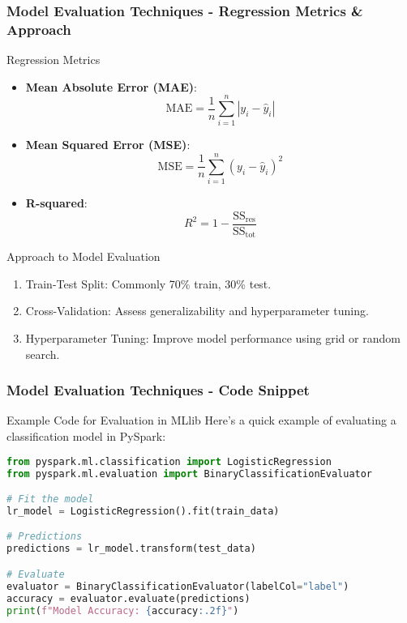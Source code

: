 \documentclass[aspectratio=169]{beamer}
\begin{document}
\begin{frame}[fragile]
    \frametitle{Model Evaluation Techniques - Regression Metrics & Approach}
    \begin{block}{Regression Metrics}
        \begin{itemize}
            \item \textbf{Mean Absolute Error (MAE)}:
            \[
            \text{MAE} = \frac{1}{n} \sum_{i=1}^{n} |y_i - \hat{y}_i|
            \]
            \item \textbf{Mean Squared Error (MSE)}:
            \[
            \text{MSE} = \frac{1}{n} \sum_{i=1}^{n} (y_i - \hat{y}_i)^2
            \]
            \item \textbf{R-squared}:
            \[
            R^2 = 1 - \frac{\text{SS}_{\text{res}}}{\text{SS}_{\text{tot}}}
            \]
        \end{itemize}
    \end{block}
    
    \begin{block}{Approach to Model Evaluation}
        \begin{enumerate}
            \item Train-Test Split: Commonly 70\% train, 30\% test.
            \item Cross-Validation: Assess generalizability and hyperparameter tuning.
            \item Hyperparameter Tuning: Improve model performance using grid or random search.
        \end{enumerate}
    \end{block}
\end{frame}

\begin{frame}[fragile]
    \frametitle{Model Evaluation Techniques - Code Snippet}
    \begin{block}{Example Code for Evaluation in MLlib}
        Here’s a quick example of evaluating a classification model in PySpark:
        \begin{lstlisting}[language=Python]
from pyspark.ml.classification import LogisticRegression
from pyspark.ml.evaluation import BinaryClassificationEvaluator

# Fit the model
lr_model = LogisticRegression().fit(train_data)

# Predictions
predictions = lr_model.transform(test_data)

# Evaluate
evaluator = BinaryClassificationEvaluator(labelCol="label")
accuracy = evaluator.evaluate(predictions)
print(f"Model Accuracy: {accuracy:.2f}")
        \end{lstlisting}
    \end{block}
\end{frame}
\end{document}
